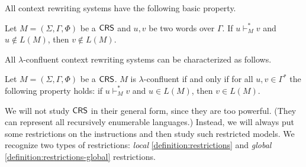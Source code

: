 All context rewriting systems have the following basic property.

\begin{lemma}\label{lemma:error-preserving}
Let $M=(\Sigma, \Gamma, \Phi)$ be a $\textup{\sf CRS\/}$ and $u, v$ be two words over $\Gamma$.
If $u \vdash_M^* v$ and $u \not\in L(M)$, then $v \not\in L(M)$.
\end{lemma}

All $\lambda$-confluent context rewriting systems can be characterized as follows.

\begin{lemma}\label{lemma:correctness-preserving}
Let $M=(\Sigma, \Gamma, \Phi)$ be a $\textup{\sf CRS\/}$. $M$ is $\lambda$-confluent if and only if for all $u, v \in \Gamma^*$ the following property holds: if $u \vdash_M^* v$ and $u \in L(M)$, then $v \in L(M)$.
\end{lemma}

We will not study $\textup{\sf CRS\/}$ in their general form, since they are too powerful. (They can represent all recursively enumerable languages.) Instead, we will always put some restrictions on the instructions and then study such restricted models. We recognize two types of restrictions: \emph{local} \ref{definition:restrictions} and \emph{global} \ref {definition:restrictions-global} restrictions.

